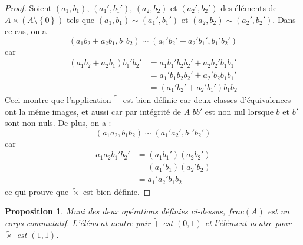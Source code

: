 \documentclass[french]{book}
\theoremstyle{plain}
\newtheorem{prop}{Proposition}[chapter]
\theoremstyle{definition}
\theoremstyle{remark}
\begin{document}
\begin{proof}
	Soient $(a_1,b_1)$, $(a_1',b_1')$, $(a_2,b_2)$ et $(a_2',b_2')$ des éléments de $A\times(A\setminus\left\{0\right\})$ tels que $(a_1,b_1)\sim(a_1',b_1')$ et $(a_2,b_2)\sim(a_2',b_2')$. Dans ce cas, on a $$(a_1b_2+a_2b_1,b_1b_2)\sim(a_1'b_2'+a_2'b_1',b_1'b_2')$$ car \begin{align*}
		(a_1b_2+a_2b_1)b_1'b_2'&=a_1b_1'b_2b_2'+a_2b_2'b_1b_1' \\
		&= a_1'b_1b_2b_2'+a_2'b_2b_1b_1' \\
		&= (a_1'b_2'+a_2'b_1')b_1b_2
	\end{align*} Ceci montre que l'application $\tilde{+}$ est bien définie car deux classes d'équivalences ont la même images, et aussi car par intégrité de $A$ $bb'$ est non nul lorsque $b$ et $b'$ sont non nuls. De plus, on a : $$(a_1a_2,b_1b_2)\sim(a_1'a_2',b_1'b_2')$$ car \begin{align*}
	a_1a_2b_1'b_2'&=(a_1b_1')(a_2b_2')\\
	&=(a_1'b_1)(a_2'b_2)\\
	&=a_1'a_2'b_1b_2
	\end{align*} ce qui prouve que $\tilde{\times}$ est bien définie.
\end{proof}
\begin{prop}
	Muni des deux opérations définies ci-dessus, $frac(A)$ est un corps commutatif. L'élément neutre puir $\tilde{+}$ est $\overline{(0,1)}$ et l'élément neutre pour $\tilde{\times}$ est $\overline{(1,1)}$.
\end{prop}
\end{document}
